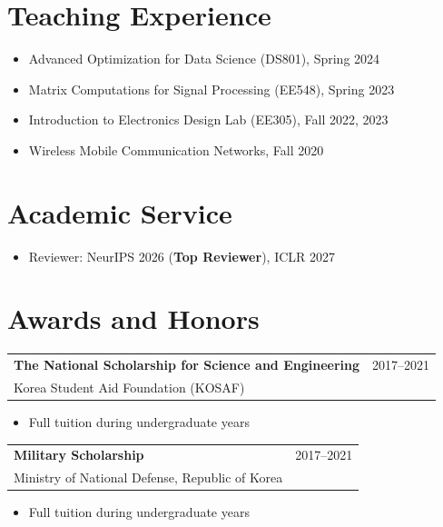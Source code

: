 \documentclass[10pt]{article}
\makeatletter
\newcommand{\entry}[4]{
  \begin{tabular*}{\textwidth}{@{\extracolsep{\fill}} l r}
    \textbf{#1} & #2 \\
    #3 & #4
  \end{tabular*}
}
\makeatother
\begin{document}
\section*{Teaching Experience}
\begin{itemize}
  \item Advanced Optimization for Data Science (DS801), Spring 2024
  \item Matrix Computations for Signal Processing (EE548), Spring 2023
  \item Introduction to Electronics Design Lab (EE305), Fall 2022, 2023
  \item Wireless Mobile Communication Networks, Fall 2020
\end{itemize}

\section*{Academic Service}
\begin{itemize}
  \item Reviewer: NeurIPS 2026 (\textbf{Top Reviewer}), ICLR 2027
\end{itemize}

\section*{Awards and Honors}
\entry{The National Scholarship for Science and Engineering}{2017--2021}{Korea Student Aid Foundation (KOSAF)}{}
\begin{itemize}
  \item Full tuition during undergraduate years
\end{itemize}

\entry{Military Scholarship}{2017--2021}{Ministry of National Defense, Republic of Korea}{}
\begin{itemize}
  \item Full tuition during undergraduate years
\end{itemize}
\end{document}
